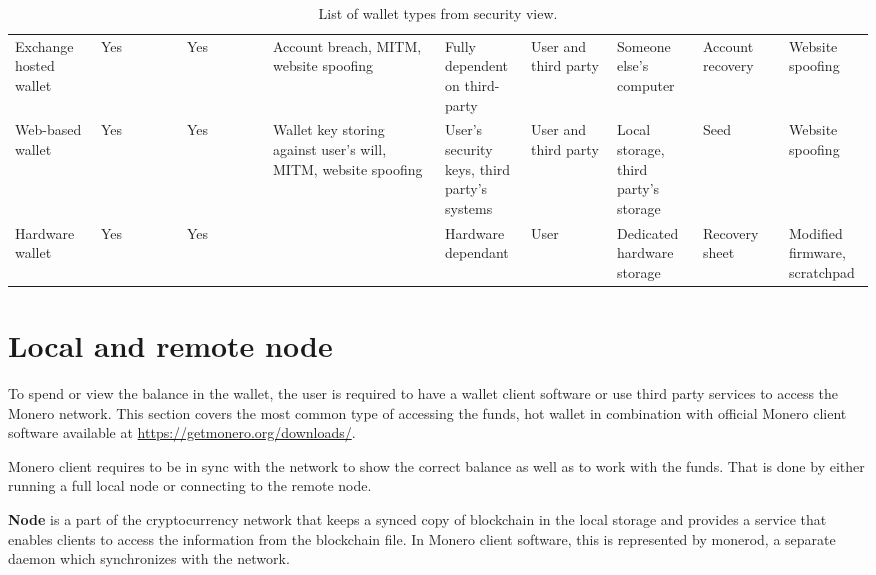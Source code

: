 \documentclass[
  printed, %
  table,   %
  lof,     %
  lot,     %
           oneside, color
]{fithesis3}
\begin{document}
\begin{table}
{\begin{tabular}{p{0.1\linewidth}p{0.1\linewidth}p{0.1\linewidth}p{0.2\linewidth}p{0.1\linewidth}p{0.1\linewidth}p{0.1\linewidth}p{0.1\linewidth}p{0.1\linewidth}}
Exchange hosted wallet & Yes                            & Yes               & Account breach, MITM, website spoofing                         & Fully dependent on third-party                    & User and third party & Someone else's computer             & Account recovery & Website spoofing              \\
Web-based wallet       & Yes                            & Yes               & Wallet key storing against user's will, MITM, website spoofing & User's security keys, third party's systems & User and third party & Local storage, third party's storage  & Seed             & Website spoofing              \\
Hardware wallet        & Yes                            & Yes               &                                                                & Hardware dependant                              & User               & Dedicated hardware storage          & Recovery sheet   & Modified firmware, scratchpad
\end{tabular}%
}
\caption{List of wallet types from security view.}
\label{table:wallettypes}
\end{table}\newpage



\section{Local and remote node}
To spend or view the balance in the wallet, the user is required to have a wallet client software or use third party services to access the Monero network. This section covers the most common type of accessing the funds, hot wallet in combination with official Monero client software available at \url{https://getmonero.org/downloads/}.

Monero client requires to be in sync with the network to show the correct balance as well as to work with the funds. That is done by either running a full local node or connecting to the remote node.

\textbf{Node} is a part of the cryptocurrency network that keeps a synced copy of blockchain in the local storage and provides a service that enables clients to access the information from the blockchain file. In Monero client software, this is represented by monerod, a separate daemon which synchronizes with the network.
\end{document}

